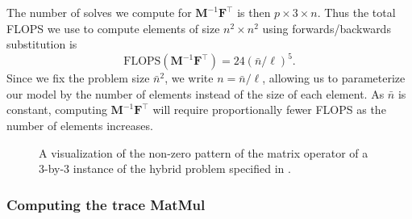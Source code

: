 %
%
%
\noindent
The number of solves we compute for $\textbf{M}^{-1}\textbf{F}^\intercal$ is then $p \times 3 \times n$.
Thus the total FLOPS we use to compute elements of size $n^2 \times n^2$ using forwards/backwards substitution is 
\begin{equation}
	\text{FLOPS}(\textbf{M}^{-1}\textbf{F}^\intercal) = 24 (\bar{n}/\ell)^5.
	\label{eqn:flops_mf}
\end{equation}
\noindent
Since we fix the problem size $\bar{n}^2$, we write $n = \bar{n}/\ell$, allowing us to parameterize our model by the number of elements instead of the size of each element. 
As $\bar{n}$ is constant, computing $\textbf{M}^{-1}\textbf{F}^\intercal$ will require proportionally fewer FLOPS as the number of elements increases.

\begin{figure}[!ht]
	\centering
	
	\caption{A visualization of the non-zero pattern of the matrix operator of a 3-by-3 instance of the hybrid problem specified 
	in .}
	\label{fig:block_diagram}
\end{figure}

%
%
%
\subsubsection{Computing the trace MatMul} 

